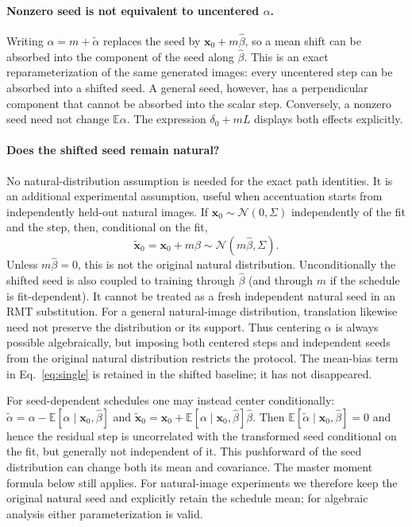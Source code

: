\documentclass[11pt]{article}
\newcommand{\E}{\mathbb E}
\newcommand{\bhat}{\hat{\beta}}
\newcommand{\x}{\mathbf{x}}
\begin{document}
\paragraph{Nonzero seed is not equivalent to uncentered $\alpha$.}
Writing $\alpha=m+\widetilde\alpha$ replaces the seed by
$\x_0+m\bhat$, so a mean shift can be absorbed into the component of the
seed along $\bhat$. This is an exact reparameterization of the same generated images: every
uncentered step can be absorbed into a shifted seed. A general seed, however,
has a perpendicular component that cannot be absorbed into the scalar step. Conversely, a nonzero seed need not change
$\E\alpha$. The expression $\delta_0+mL$ displays both effects explicitly.


\paragraph{Does the shifted seed remain natural?}
No natural-distribution assumption is needed for the exact path identities.
It is an additional experimental assumption, useful when accentuation starts
from independently held-out natural images. If
$\x_0\sim\mathcal N(0,\Sigma)$ independently of the fit and the step, then,
conditional on the fit,
\[
 \widetilde{\x}_0=\x_0+m\bhat
 \sim\mathcal N(m\bhat,\Sigma).
\]
Unless $m\bhat=0$, this is not the original natural distribution. Unconditionally
the shifted seed is also coupled to training through $\bhat$ (and through $m$
if the schedule is fit-dependent). It cannot be treated as a fresh independent
natural seed in an RMT substitution. For a general natural-image distribution,
translation likewise need not preserve the distribution or its support.
Thus centering $\alpha$ is always possible algebraically, but imposing both
centered steps and independent seeds from the original natural distribution
restricts the protocol. The mean-bias term in Eq.~\eqref{eq:single} is retained
in the shifted baseline; it has not disappeared.

For seed-dependent schedules one may instead center conditionally:
$\widetilde\alpha=\alpha-\E[\alpha\mid\x_0,\bhat]$ and
$\widetilde{\x}_0=\x_0+\E[\alpha\mid\x_0,\bhat]\bhat$.
Then $\E[\widetilde\alpha\mid\x_0,\bhat]=0$ and hence the residual step is
uncorrelated with the transformed seed conditional on the fit, but generally
not independent of it. This pushforward of the seed distribution can change
both its mean and covariance. The master moment formula below still applies.
For natural-image experiments we therefore keep the original natural seed
and explicitly retain the schedule mean; for algebraic analysis either
parameterization is valid.
\end{document}
